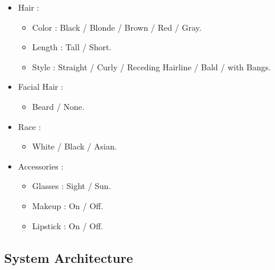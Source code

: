 \begin{itemize}
\begin{itemize}
    \end{itemize}
    \item Hair :
    \begin{itemize}
        \item Color : Black / Blonde / Brown / Red / Gray.
        \item Length : Tall / Short.
        \item Style : Straight / Curly / Receding Hairline / Bald / with Bangs.
    \end{itemize}
    \item Facial Hair :
    \begin{itemize}
        \item Beard / None.
    \end{itemize}
    \item Race :
    \begin{itemize}
        \item White / Black / Asian.
    \end{itemize}
    \item Accessories :
    \begin{itemize}
        \item Glasses : Sight / Sun.
        \item Makeup : On / Off.
        \item Lipstick : On / Off.
    \end{itemize}
\end{itemize}

\subsection{System Architecture}

